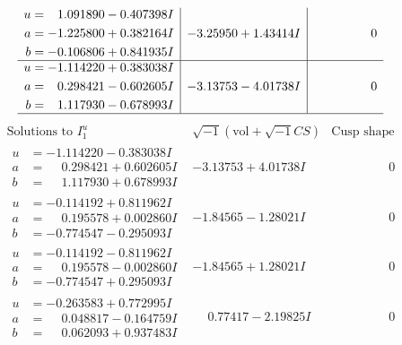 \documentclass[1p]{elsarticle_modified}
\theoremstyle{definition}
\newcommand{\I}{\sqrt{-1}}
\begin{document}
$$\begin{array}{c|c|c}
\begin{aligned}
u &= \phantom{-}1.091890 - 0.407398 I \\
a &= -1.225800 + 0.382164 I \\
b &= -0.106806 + 0.841935 I\end{aligned}
 & -3.25950 + 1.43414 I & \phantom{-0.000000 } 0 \\ \hline\begin{aligned}
u &= -1.114220 + 0.383038 I \\
a &= \phantom{-}0.298421 - 0.602605 I \\
b &= \phantom{-}1.117930 - 0.678993 I\end{aligned}
 & -3.13753 - 4.01738 I & \phantom{-0.000000 } 0\\
 \hline 
 \end{array}$$\newpage$$\begin{array}{c|c|c}  
\text{Solutions to }I^u_{1}& \I (\text{vol} + \sqrt{-1}CS) & \text{Cusp shape}\\
 \hline 
\begin{aligned}
u &= -1.114220 - 0.383038 I \\
a &= \phantom{-}0.298421 + 0.602605 I \\
b &= \phantom{-}1.117930 + 0.678993 I\end{aligned}
 & -3.13753 + 4.01738 I & \phantom{-0.000000 } 0 \\ \hline\begin{aligned}
u &= -0.114192 + 0.811962 I \\
a &= \phantom{-}0.195578 + 0.002860 I \\
b &= -0.774547 - 0.295093 I\end{aligned}
 & -1.84565 - 1.28021 I & \phantom{-0.000000 } 0 \\ \hline\begin{aligned}
u &= -0.114192 - 0.811962 I \\
a &= \phantom{-}0.195578 - 0.002860 I \\
b &= -0.774547 + 0.295093 I\end{aligned}
 & -1.84565 + 1.28021 I & \phantom{-0.000000 } 0 \\ \hline\begin{aligned}
u &= -0.263583 + 0.772995 I \\
a &= \phantom{-}0.048817 - 0.164759 I \\
b &= \phantom{-}0.062093 + 0.937483 I\end{aligned}
 & \phantom{-}0.77417 - 2.19825 I & \phantom{-0.000000 } 0 \\ \hline\begin{aligned}

\end{aligned}
\end{array}$$
\end{document}
